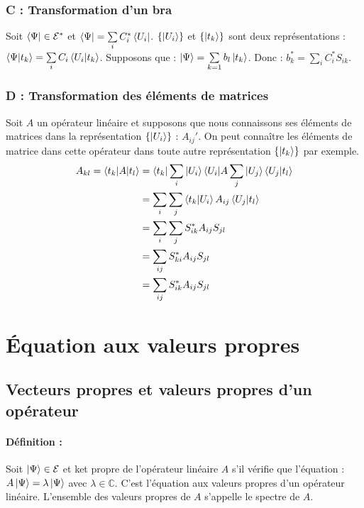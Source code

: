 \documentclass[12pt,a4paper,titlepage]{book}
\begin{document}
\subsubsection{C : Transformation d'un bra}

Soit $\bra{\Psi} \in \mathcal{E}^*$ et $\bra{\Psi} = \sum\limits_i C_i^* \bra{U_i}$. $\left\lbrace \ket{U_i} \right\rbrace$ et $\left\lbrace \ket{t_k} \right\rbrace$ sont deux représentations : $\braket{\Psi | t_k} = \sum\limits_i C_i \braket{U_i | t_k}$. Supposons que : $\ket{\Psi} = \sum\limits_{k = 1} b_l \ket{t_k}$. Donc : $b_k^* = \sum\limits_i C_i^* S_{ik}$.

\subsubsection{D : Transformation des éléments de matrices}

Soit $A$ un opérateur linéaire et supposons que nous connaissons ses éléments de matrices dans la représentation $\left\lbrace \ket{U_i} \right\rbrace$ : $A_{ij}'$. On peut connaître les éléments de matrice dans cette opérateur dans toute autre représentation $\left\lbrace \ket{t_k} \right\rbrace$ par exemple.
\begin{align*}
A_{kl} = \braket{t_k | A | t_l} &= \braket{t_k | \sum\limits_i | U_i} \braket{U_i | A \sum\limits_j | U_j} \braket{U_j | t_l}\\
&= \sum\limits_i \sum\limits_j \braket{t_k | U_i} A_{ij} \braket{U_j | t_l}\\
&= \sum\limits_i \sum\limits_j S_{ik}^* A_{ij} S_{jl}\\
&= \sum\limits_{ij} S_{ki}^* A_{ij} S_{jl}\\
&= \sum\limits_{ij} S_{ik}^* A_{ij} S_{jl}
\end{align*}

\section{Équation aux valeurs propres}
\subsection{Vecteurs propres et valeurs propres d'un opérateur}
\paragraph*{Définition :}
Soit $\ket{\Psi} \in \mathcal{E}$ et ket propre de l'opérateur linéaire $A$ s'il vérifie que l'équation : $A \ket{\Psi} = \lambda \ket{\Psi}$ avec $\lambda \in \mathbb{C}$. C'est l'équation aux valeurs propres d'un opérateur linéaire. L'ensemble des valeurs propres de $A$ s'appelle le spectre de $A$.
\end{document}
